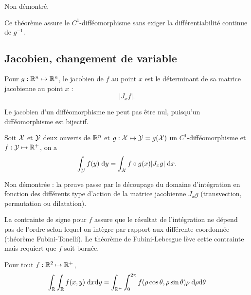 \proof Non démontré. \eproof

\remark
Ce théorème assure le $C^1$-difféomorphisme sans exiger la différentiabilité continue de $g^{-1}$.

\subsection{Jacobien, changement de variable}

\begin{definition*}[Jacobien]
  Pour $g : \mathbb{R}^n \mapsto \mathbb{R}^n$, le jacobien de $f$ au point $x$ est le déterminant de sa matrice jacobienne au point $x$ : 
  $$
  |J_x f|.
  $$
\end{definition*}

\remark
Le jacobien d'un difféomorphisme ne peut pas être nul, puisqu'un difféomorphisme est bijectif.

\begin{theorem*}
  Soit $\mathcal{X}$ et $\mathcal{Y}$ deux ouverts de $\mathbb{R}^n$ et $g : \mathcal{X} \mapsto \mathcal{Y} = g(\mathcal{X})$ un $C^1$-difféomorphisme et $f : \mathcal{Y} \mapsto \mathbb{R}^+$, on a 
  $$
  \int_{\mathcal{Y}} f(y) \; \text{d} y = \int_{\mathcal{X}} f \circ g(x) |J_x g| \; \text{d} x.
  $$
\end{theorem*}

\proof
Non démontrée : la preuve passe par le découpage du domaine d'intégration en fonction des différents type d'action de la matrice jacobienne $J_x g$ (transvection, permutation ou
dilatation).
\eproof

\remark
La contrainte de signe pour $f$ assure que le résultat de l'intégration ne dépend pas de l'ordre selon lequel on intègre par rapport aux différente coordonnée (théorème Fubini-Tonelli). Le théorème de Fubini-Lebesgue lève cette contrainte mais requiert que $f$ soit bornée.

\begin{corollary*}
  Pour tout $f : \mathbb{R}^2 \mapsto \mathbb{R}^+$, 
  $$
  \int_{\mathbb{R}} \int_{\mathbb{R}} f(x, y) \; \text{d} x \text{d} y
  = \int_{\mathbb{R}^+} \int_0^{2 \pi} f(\rho \cos \theta, \rho \sin \theta) \rho \; \text{d} \rho \text{d} \theta
  $$
\end{corollary*}

